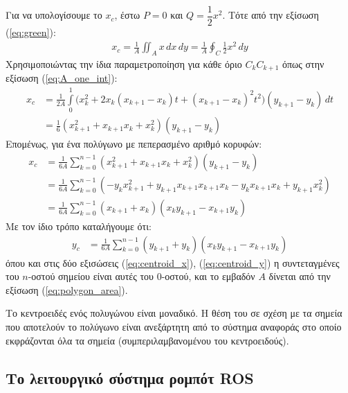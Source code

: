 Για να υπολογίσουμε το $x_c$, έστω $P = 0$ και $Q = \dfrac{1}{2}x^2$. Tότε από
την εξίσωση (\ref{eq:green}):
\begin{align}
  x_c = \frac{1}{A} \iint_A x \,dx \,dy = \frac{1}{A}\oint_C \frac{1}{2} x^2 \,dy
\end{align}
Χρησιμοποιώντας την ίδια παραμετροποίηση για κάθε όριο $C_k C_{k+1}$ όπως στην εξίσωση
(\ref{eq:A_one_int}):
\begin{align}
  x_c &= \frac{1}{2A} \int\limits_0^1 \big( x_k^2 + 2x_k (x_{k+1} - x_k)t + (x_{k+1} - x_k)^2 t^2 \big) (y_{k+1}- y_k) \,dt \nonumber \\
      &= \frac{1}{6}(x_{k+1}^2 + x_{k+1} x_k + x_k^2)(y_{k+1} - y_k) \nonumber
\end{align}
Επομένως, για ένα πολύγωνο με πεπερασμένο αριθμό κορυφών:
\begin{align}
  x_c &= \frac{1}{6A} \sum\limits_{k=0}^{n-1} (x_{k+1}^2 + x_{k+1} x_k + x_k^2)(y_{k+1} - y_k) \nonumber \\
      & = \frac{1}{6A} \sum\limits_{k=0}^{n-1} (-y_k x_{k+1}^2 + y_{k+1} x_{k+1} x_{k+1} x_k - y_k x_{k+1} x_k + y_{k+1} x_k^2) \nonumber \\
      &= \frac{1}{6A} \sum\limits_{k=0}^{n-1} (x_{k+1} + x_k) (x_k y_{k+1} - x_{k+1} y_k)
\label{eq:centroid_x}
\end{align}
Με τον ίδιο τρόπο καταλήγουμε ότι:
\begin{align}
  y_c &= \frac{1}{6A} \sum\limits_{k=0}^{n-1} (y_{k+1} + y_k) (x_k y_{k+1} - x_{k+1} y_k)
\label{eq:centroid_y}
\end{align}
όπου και στις δύο εξισώσεις (\ref{eq:centroid_x}), (\ref{eq:centroid_y}) η
συντεταγμένες του $n$-οστού σημείου είναι αυτές του $0$-οστού, και το εμβαδόν
$A$ δίνεται από την εξίσωση (\ref{eq:polygon_area}).

\begin{gg_box}
\begin{remark}
  \label{remark:centroid_uniqueness}
  Το κεντροειδές ενός πολυγώνου είναι μοναδικό. Η θέση του σε σχέση με τα
  σημεία που αποτελούν το πολύγωνο είναι ανεξάρτητη από το σύστημα αναφοράς στο
  οποίο εκφράζονται όλα τα σημεία (συμπεριλαμβανομένου του κεντροειδούς).
\end{remark}
\end{gg_box}


\subsection{Το λειτουργικό σύστημα ρομπότ ROS}
\label{subsec:01_01_02_9}

